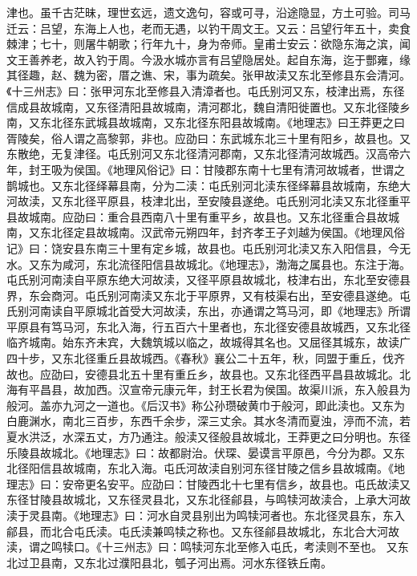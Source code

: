 \documentclass[12pt,UTF8]{ctexbook}
\begin{document}
津也。虽千古茫昧，理世玄远，遗文逸句，容或可寻，沿途隐显，方土可验。司马迁云：吕望，东海上人也，老而无遇，以钓干周文王。又云：吕望行年五十，卖食棘津；七十，则屠牛朝歌；行年九十，身为帝师。皇甫士安云：欲隐东海之滨，闻文王善养老，故入钓于周。今汲水城亦言有吕望隐居处。起自东海，迄于酆雍，缘其径趣，赵、魏为密，厝之谯、宋，事为疏矣。张甲故渎又东北至修县东会清河。《十三州志》曰：张甲河东北至修县入清漳者也。屯氏别河又东，枝津出焉，东径信成县故城南，又东径清阳县故城南，清河郡北，魏自清阳徙置也。又东北径陵乡南，又东北径东武城县故城南，又东北径东阳县故城南。《地理志》曰王莽更之曰胥陵矣，俗人谓之高黎郭，非也。应劭曰：东武城东北三十里有阳乡，故县也。又东散绝，无复津径。屯氏别河又东北径清河郡南，又东北径清河故城西。汉高帝六年，封王吸为侯国。《地理风俗记》曰：甘陵郡东南十七里有清河故城者，世谓之鹊城也。又东北径绎幕县南，分为二渎：屯氏别河北渎东径绎幕县故城南，东绝大河故渎，又东北径平原县，枝津北出，至安陵县遂绝。屯氏别河北渎又东北径重平县故城南。应劭曰：重合县西南八十里有重平乡，故县也。又东北径重合县故城南，又东北径定县故城南。汉武帝元朔四年，封齐孝王子刘越为侯国。《地理风俗记》曰：饶安县东南三十里有定乡城，故县也。屯氏别河北渎又东入阳信县，今无水。又东为咸河，东北流径阳信县故城北。《地理志》，渤海之属县也。东注于海。屯氏别河南渎自平原东绝大河故渎，又径平原县故城北，枝津右出，东北至安德县界，东会商河。屯氏别河南渎又东北于平原界，又有枝渠右出，至安德县遂绝。屯氏别河南读自平原城北首受大河故渎，东出，亦通谓之笃马河，即《地理志》所谓平原县有笃马河，东北入海，行五百六十里者也，东北径安德县故城西，又东北径临齐城南。始东齐未宾，大魏筑城以临之，故城得其名也。又屈径其城东，故读广四十步，又东北径重丘县故城西。《春秋》襄公二十五年，秋，同盟于重丘，伐齐故也。应劭曰，安德县北五十里有重丘乡，故县也。又东北径西平昌县故城北。北海有平昌县，故加西。汉宣帝元康元年，封王长君为侯国。故渠川派，东入般县为般河。盖亦九河之一道也。《后汉书》称公孙瓒破黄巾于般河，即此渎也。又东为白鹿渊水，南北三百步，东西千余步，深三丈余。其水冬清而夏浊，渟而不流，若夏水洪泛，水深五丈，方乃通注。般渎又径般县故城北，王莽更之曰分明也。东径乐陵县故城北。《地理志》曰：故都尉治。伏琛、晏谟言平原邑，今分为郡。又东北径阳信县故城南，东北入海。屯氏河故渎自别河东径甘陵之信乡县故城南。《地理志》曰：安帝更名安平。应劭曰：甘陵西北十七里有信乡，故县也。屯氏故渎又东径甘陵县故城北，又东径灵县北，又东北径鄃县，与鸣犊河故渎合，上承大河故渎于灵县南。《地理志》曰：河水自灵县别出为鸣犊河者也。东北径灵县东，东入鄃县，而北合屯氏渎。屯氏渎兼鸣犊之称也。又东径鄃县故城北，东北合大河故渎，谓之鸣犊口。《十三州志》曰：鸣犊河东北至修入屯氏，考渎则不至也。
又东北过卫县南，又东北过濮阳县北，瓠子河出焉。河水东径铁丘南。
\end{document}
